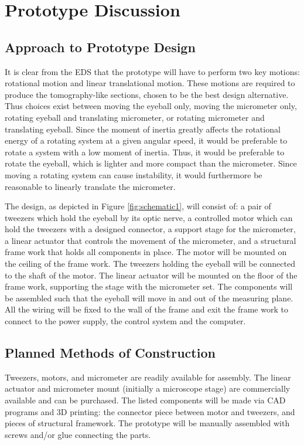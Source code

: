 \documentclass{article}
\begin{document}
\section{Prototype Discussion}
\subsection{Approach to Prototype Design}
It is clear from the EDS that the prototype will have to perform two key motions: rotational motion and linear translational motion. These motions are required to produce the tomography-like sections, chosen to be the best design alternative. Thus choices exist between moving the eyeball only, moving the micrometer only, rotating eyeball and translating micrometer, or rotating micrometer and translating eyeball. Since the moment of inertia greatly affects the rotational energy of a rotating system at a given angular speed, it would be preferable to rotate a system with a low moment of inertia. Thus, it would be preferable to rotate the eyeball, which is lighter and more compact than the micrometer. Since moving a rotating system can cause instability, it would furthermore be reasonable to linearly translate the micrometer. 

The design, as depicted in Figure \ref{fig:schematic1}, will consist of: a pair of tweezers which hold the eyeball by its optic nerve, a controlled motor which can hold the tweezers with a designed connector, a support stage for the micrometer, a linear actuator that controls the movement of the micrometer, and a structural frame work that holds all components in place. The motor will be mounted on the ceiling of the frame work. The tweezers holding the eyeball will be connected to the shaft of the motor. The linear actuator will be mounted on the floor of the frame work, supporting the stage with the micrometer set. The components will be assembled such that the eyeball will move in and out of the measuring plane. All the wiring will be fixed to the wall of the frame and exit the frame work to connect to the power supply, the control system and the computer.

\subsection{Planned Methods of Construction}
Tweezers, motors, and micrometer are readily available for assembly. The linear actuator and micrometer mount (initially a microscope stage) are commercially available and can be purchased. The listed components will be made via CAD programs and 3D printing: the connector piece between motor and tweezers, and pieces of structural framework. The prototype will be manually assembled with screws and/or glue connecting the parts.
\end{document}
